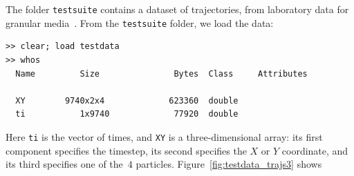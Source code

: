 \documentclass[12pt]{article}
\begin{document}
The folder \lstinline{testsuite} %
%
contains a dataset of trajectories, from laboratory data for granular
media~\citep{Puckett2012}.  From the \lstinline{testsuite} folder, we load the
data:
\begin{lstlisting}[frame=single,framerule=0pt]
>> clear; load testdata
>> whos
  Name         Size               Bytes  Class     Attributes

  XY        9740x2x4             623360  double
  ti           1x9740             77920  double
\end{lstlisting}
Here \lstinline{ti} is the vector of times, and \lstinline{XY} is a
three-dimensional array: its first component specifies the timestep,
its second specifies the $X$ or $Y$ coordinate, and its third
specifies one of the~$4$ particles.  Figure~\ref{fig:testdata_trajs3}
shows
%
\begin{figure}
\begin{center}
\hspace{1em}
\subfigure[]{
}
\end{center}
\end{figure}
\end{document}
